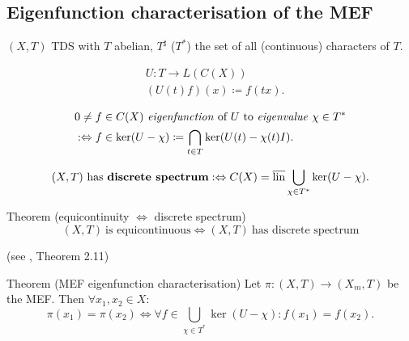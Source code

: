 \subsection{Eigenfunction characterisation of the MEF}
\begin{frame}
  $(X,T)$ TDS with $T$ abelian, $T^\sharp$ ($T^*$) the set of all (continuous) characters of $T$.
\begin{definition}
  \begin{equation*}
    \begin{split}
      &U : T \longrightarrow L(C(X)) \\
      &(U(t) f)(x) \coloneq f(tx).
    \end{split}
  \end{equation*}
   \end{definition}
   \pause
   \begin{definition}
   \begin{equation*}
    \begin{split}
      &0 \neq f \in C(X) \ \text{\emph{eigenfunction} of} \ U \ \text{to \emph{eigenvalue}} \ \chi \in T^*   \\
 &:\Leftrightarrow f \in \ker (U-\chi)\coloneq \bigcap_{t \in T} \ker (U(t)- \chi (t)I).
    \end{split}
      \end{equation*}
   \end{definition}
\end{frame}
\begin{frame}[fragile]
 \begin{definition}
  \begin{equation*}
    (X,T) \ \text{has \textbf{discrete spectrum}}:\Leftrightarrow C(X) = \overline{\operatorname{lin}} \bigcup_{\chi \in T^*} \ker (U- \chi).
  \end{equation*}
\end{definition}
\pause 
  \begin{alertblock}{Theorem (equicontinuity $\Leftrightarrow$ discrete spectrum)}%
  \begin{equation*}
    (X,T) \ \text{is equicontinuous} \Leftrightarrow (X,T) \ \text{has discrete spectrum}
  \end{equation*}

    \hfill(see \cite{HK2023}, Theorem 2.11)
\end{alertblock}
\pause
  \begin{alertblock}{Theorem (MEF eigenfunction characterisation)}
  \label{thm:MEF_EFchar}
  Let $\pi : (X,T) \to (X_m,T)$ be the MEF.
  Then $\forall x_1, x_2 \in X$:
  \begin{equation*}
  \pi (x_1) = \pi (x_2) \Leftrightarrow 
    \forall f \in \bigcup_{\chi \in T^*} \ker (U- \chi) : f(x_1) = f(x_2).
  \end{equation*}
\end{alertblock}
\end{frame}
